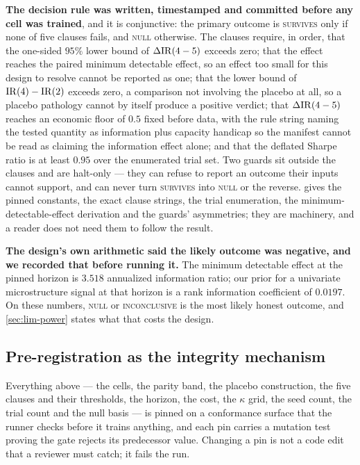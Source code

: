 \textbf{The decision rule was written, timestamped and committed before any cell was trained}, and
it is conjunctive: the primary outcome is \textsc{survives} only if none of five clauses fails, and
\textsc{null} otherwise. The clauses require, in order, that the one-sided $95\%$ lower bound of
$\Delta\mathrm{IR}(4-5)$ exceeds zero; that the effect reaches the paired minimum detectable effect, so an
effect too small for this design to resolve cannot be reported as one; that the lower bound of
$\mathrm{IR}(4)-\mathrm{IR}(2)$ exceeds zero, a comparison not involving the placebo at all, so a placebo pathology
cannot by itself produce a positive verdict; that $\Delta\mathrm{IR}(4-5)$ reaches an economic floor of
$0.5$ fixed before data, with the rule string naming the tested quantity as information plus
capacity handicap so the manifest cannot be read as claiming the information effect alone; and that
the deflated Sharpe ratio is at least $0.95$ over the enumerated trial set. \label{tab:verdict}
Two guards sit outside the clauses and are halt-only --- they can refuse to report an outcome their
inputs cannot support, and can never turn \textsc{survives} into \textsc{null} or the reverse.
 gives the pinned constants, the exact clause strings, the trial enumeration, the
minimum-detectable-effect derivation and the guards' asymmetries; they are machinery, and a reader
does not need them to follow the result.

\textbf{The design's own arithmetic said the likely outcome was negative, and we recorded that
before running it.} The minimum detectable effect at the pinned horizon is $3.518$ annualized
information ratio; our prior for a univariate microstructure signal at that horizon is a rank
information coefficient of $0.0197$. On these numbers, \textsc{null} or \textsc{inconclusive} is
the most likely honest outcome, and \cref{sec:lim-power} states what that costs the design.

\subsection{Pre-registration as the integrity mechanism}
\label{sec:prereg}

Everything above --- the cells, the parity band, the placebo construction, the five clauses and
their thresholds, the horizon, the cost, the $\kappa$ grid, the seed count, the trial count and the
null basis --- is pinned on a conformance surface that the runner checks before it trains
anything, and each pin carries a mutation test proving the gate rejects its predecessor value.
Changing a pin is not a code edit that a reviewer must catch; it fails the run.

